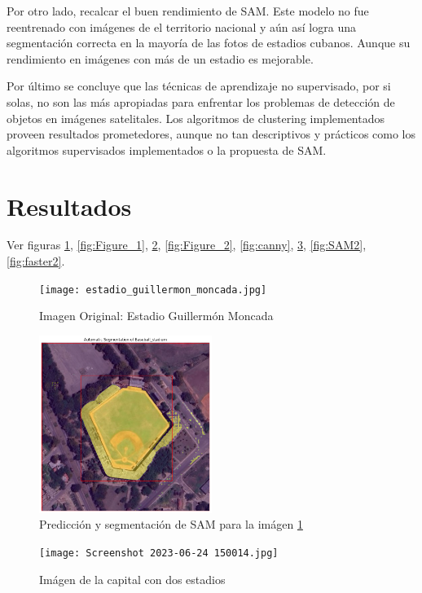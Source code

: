 \documentclass[article]{llncs}
\begin{document}
Por otro lado, recalcar el buen rendimiento de SAM. Este modelo no fue reentrenado con im\'agenes de el territorio nacional y 
a\'un as\'i logra una segmentación correcta en la mayor\'ia de las fotos de estadios cubanos. Aunque su rendimiento en im\'agenes 
con m\'as de un estadio es mejorable.

Por \'ultimo se concluye que las t\'ecnicas de aprendizaje no supervisado, por si solas, no son las m\'as apropiadas 
para enfrentar los problemas de detección de objetos en im\'agenes satelitales. Los algoritmos de clustering implementados 
proveen resultados prometedores, aunque no tan descriptivos y pr\'acticos como los algoritmos supervisados implementados o la 
propuesta de SAM.



\section{Resultados}

Ver figuras \ref{fig:estadio_guillermon_moncada}, \ref{fig:Figure_1}, \ref{fig:SAM}, \ref{fig:Figure_2},
\ref{fig:canny}, \ref{fig:capital}, \ref{fig:SAM2}, \ref{fig:faster2}.

\begin{figure}[h]
  \centering
  \texttt{[image: estadio\_guillermon\_moncada.jpg]}
  \caption{Imagen Original: Estadio Guillerm\'on Moncada}
  \label{fig:estadio_guillermon_moncada}
\end{figure}

\begin{figure}[h]
  \centering
  \includegraphics[width=0.5\textwidth]{SAM.png}
  \caption{Predicci\'on y segmentación de SAM para la im\'agen \ref{fig:estadio_guillermon_moncada}}
  \label{fig:SAM}
\end{figure}

\begin{figure}[h]
    \centering
    \texttt{[image: Screenshot 2023-06-24 150014.jpg]}
    \caption{Im\'agen de la capital con dos estadios}
    \label{fig:capital}
  \end{figure}
\end{document}
